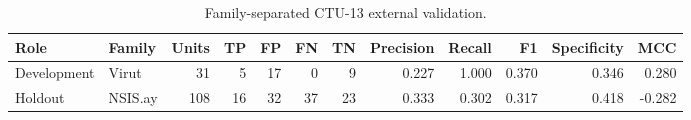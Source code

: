 \begin{table}[htbp]
\centering
\caption{Family-separated CTU-13 external validation.}
\label{tab:ctu13-metrics}
\small
\begin{adjustbox}{max width=\linewidth}
\begin{tabular}{llrrrrrrrrrr}
\toprule
Role & Family & Units & TP & FP & FN & TN & Precision & Recall & F1 & Specificity & MCC \\
\midrule
Development & Virut & 31 & 5 & 17 & 0 & 9 & 0.227 & 1.000 & 0.370 & 0.346 & 0.280 \\
Holdout & NSIS.ay & 108 & 16 & 32 & 37 & 23 & 0.333 & 0.302 & 0.317 & 0.418 & -0.282 \\
\bottomrule
\end{tabular}
\end{adjustbox}
\par{}
\end{table}
